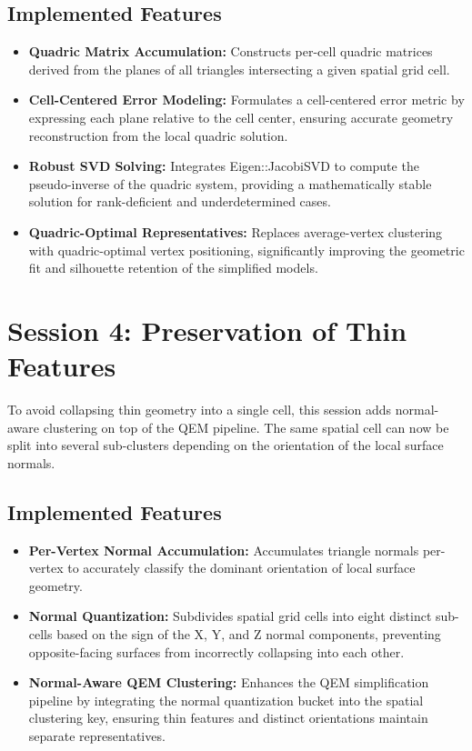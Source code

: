 \documentclass[a4paper]{article}
\begin{document}
\subsection{Implemented Features}
\begin{itemize}[noitemsep]
    \item \textbf{Quadric Matrix Accumulation:} Constructs per-cell quadric matrices derived from the planes of all triangles intersecting a given spatial grid cell.
    \item \textbf{Cell-Centered Error Modeling:} Formulates a cell-centered error metric by expressing each plane relative to the cell center, ensuring accurate geometry reconstruction from the local quadric solution.
    \item \textbf{Robust SVD Solving:} Integrates Eigen::JacobiSVD to compute the pseudo-inverse of the quadric system, providing a mathematically stable solution for rank-deficient and underdetermined cases.
    \item \textbf{Quadric-Optimal Representatives:} Replaces average-vertex clustering with quadric-optimal vertex positioning, significantly improving the geometric fit and silhouette retention of the simplified models.
\end{itemize}

\section{Session 4: Preservation of Thin Features}

To avoid collapsing thin geometry into a single cell, this session adds normal-aware clustering on top of the QEM pipeline. The same spatial cell can now be split into several sub-clusters depending on the orientation of the local surface normals.

\subsection{Implemented Features}
\begin{itemize}[noitemsep]
    \item \textbf{Per-Vertex Normal Accumulation:} Accumulates triangle normals per-vertex to accurately classify the dominant orientation of local surface geometry.
    \item \textbf{Normal Quantization:} Subdivides spatial grid cells into eight distinct sub-cells based on the sign of the X, Y, and Z normal components, preventing opposite-facing surfaces from incorrectly collapsing into each other.
    \item \textbf{Normal-Aware QEM Clustering:} Enhances the QEM simplification pipeline by integrating the normal quantization bucket into the spatial clustering key, ensuring thin features and distinct orientations maintain separate representatives.
\end{itemize}
\end{document}
